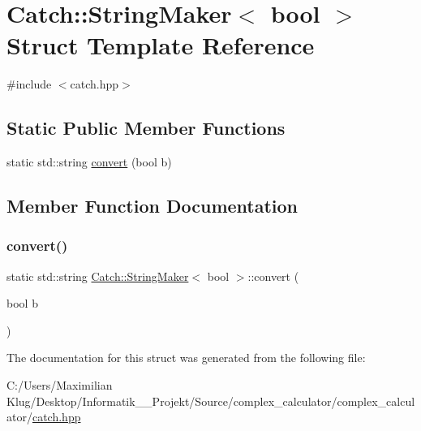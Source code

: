 \hypertarget{struct_catch_1_1_string_maker_3_01bool_01_4}{}\section{Catch\+:\+:String\+Maker$<$ bool $>$ Struct Template Reference}
\label{struct_catch_1_1_string_maker_3_01bool_01_4}


{\ttfamily \#include $<$catch.\+hpp$>$}

\subsection*{Static Public Member Functions}
\begin{DoxyCompactItemize}
\item 
static std\+::string \mbox{\hyperlink{struct_catch_1_1_string_maker_3_01bool_01_4_a37e9899c82c4b4515f876f16f8957a77}{convert}} (bool b)
\end{DoxyCompactItemize}


\subsection{Member Function Documentation}
\mbox{\label{struct_catch_1_1_string_maker_3_01bool_01_4_a37e9899c82c4b4515f876f16f8957a77}} 
\subsubsection{\texorpdfstring{convert()}{convert()}}
{\footnotesize\ttfamily static std\+::string \mbox{\hyperlink{struct_catch_1_1_string_maker}{Catch\+::\+String\+Maker}}$<$ bool $>$\+::convert (\begin{DoxyParamCaption}\item[{bool}]{b }\end{DoxyParamCaption})\hspace{0.3cm}{\ttfamily [static]}}



The documentation for this struct was generated from the following file\+:\begin{DoxyCompactItemize}
\item 
C\+:/\+Users/\+Maximilian Klug/\+Desktop/\+Informatik\+\_\+\_\+\+Projekt/\+Source/complex\+\_\+calculator/complex\+\_\+calculator/\mbox{\hyperlink{catch_8hpp}{catch.\+hpp}}\end{DoxyCompactItemize}
